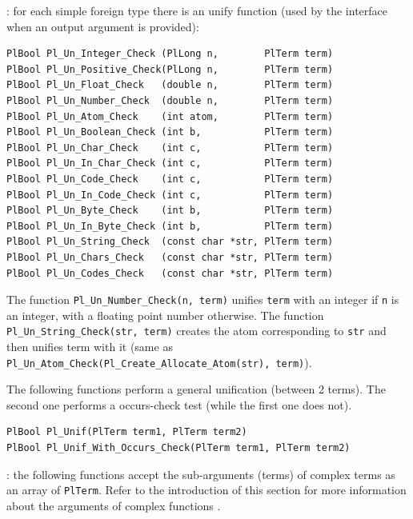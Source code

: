 : for each simple foreign type
 there is an unify function (used by the
interface when an output argument is provided):

\begin{Code}
\begin{verbatim}
PlBool Pl_Un_Integer_Check (PlLong n,        PlTerm term)
PlBool Pl_Un_Positive_Check(PlLong n,        PlTerm term)
PlBool Pl_Un_Float_Check   (double n,        PlTerm term)
PlBool Pl_Un_Number_Check  (double n,        PlTerm term)
PlBool Pl_Un_Atom_Check    (int atom,        PlTerm term)
PlBool Pl_Un_Boolean_Check (int b,           PlTerm term)
PlBool Pl_Un_Char_Check    (int c,           PlTerm term)
PlBool Pl_Un_In_Char_Check (int c,           PlTerm term)
PlBool Pl_Un_Code_Check    (int c,           PlTerm term)
PlBool Pl_Un_In_Code_Check (int c,           PlTerm term)
PlBool Pl_Un_Byte_Check    (int b,           PlTerm term)
PlBool Pl_Un_In_Byte_Check (int b,           PlTerm term)
PlBool Pl_Un_String_Check  (const char *str, PlTerm term)
PlBool Pl_Un_Chars_Check   (const char *str, PlTerm term)
PlBool Pl_Un_Codes_Check   (const char *str, PlTerm term)
\end{verbatim}
\end{Code}

The function \texttt{Pl\_Un\_Number\_Check(n, term)} unifies \texttt{term} with
an integer if \texttt{n} is an integer, with a floating point number
otherwise. The function \texttt{Pl\_Un\_String\_Check(str, term)} creates the
atom corresponding to \texttt{str} and then unifies term with it (same as
\texttt{Pl\_Un\_Atom\_Check(Pl\_Create\_Allocate\_Atom(str), term)}).

The following functions perform a general unification (between 2 terms). The
second one performs a occurs-check test (while the first one does not).

\begin{Code}
\begin{verbatim}
PlBool Pl_Unif(PlTerm term1, PlTerm term2)
PlBool Pl_Unif_With_Occurs_Check(PlTerm term1, PlTerm term2)
\end{verbatim}
\end{Code}

: the following functions accept the sub-arguments
(terms) of complex terms as an array of \texttt{PlTerm}. Refer to the
introduction of this section for more information about the arguments of
complex functions .

